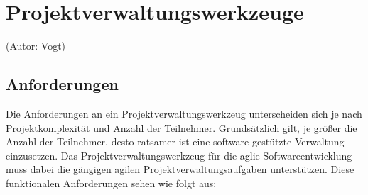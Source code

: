 \section{Projektverwaltungswerkzeuge}
(Autor: Vogt)\\

\subsection{Anforderungen}
Die Anforderungen an ein Projektverwaltungswerkzeug unterscheiden sich je nach Projektkomplexität und Anzahl der Teilnehmer. Grundsätzlich gilt, je größer die Anzahl der Teilnehmer, desto ratsamer ist eine software-gestützte Verwaltung einzusetzen.
Das Projektverwaltungswerkzeug für die aglie Softwareentwicklung muss dabei die gängigen agilen Projektverwaltungsaufgaben unterstützen. Diese funktionalen Anforderungen sehen wie folgt aus:


